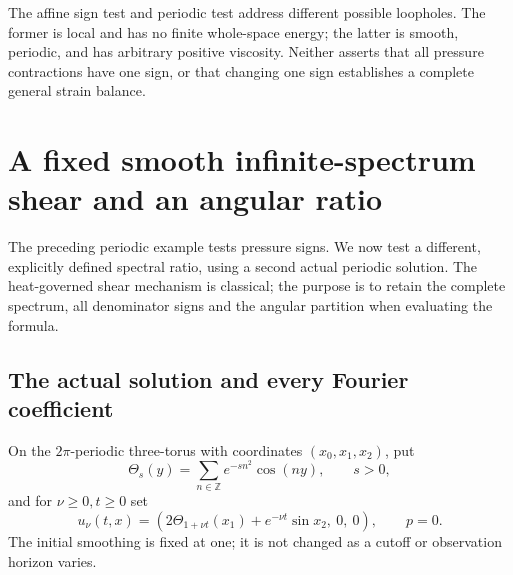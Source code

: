 \documentclass[11pt]{article}
\begin{document}
The affine sign test and periodic test address different possible
loopholes. The former is local and has no finite whole-space energy;
the latter is smooth, periodic, and has arbitrary positive viscosity.
Neither asserts that all pressure contractions have one sign, or that
changing one sign establishes a complete general strain balance.

\section{A fixed smooth infinite-spectrum shear and an angular ratio}
The preceding periodic example tests pressure signs. We now test a different,
explicitly defined spectral ratio, using a second actual periodic solution.
The heat-governed shear mechanism is classical; the purpose is to retain
the complete spectrum, all denominator signs and the angular partition
when evaluating the formula.

\subsection{The actual solution and every Fourier coefficient}
On the $2\pi$-periodic three-torus with coordinates $(x_0,x_1,x_2)$, put
\[
 \Theta_s(y)=\sum_{n\in\mathbb Z}e^{-sn^2}\cos(ny),\qquad s>0,
\]
and for $\nu\geq0,t\geq0$ set
\begin{equation}\label{eq:infshear}
 u_\nu(t,x)=\left(2\Theta_{1+\nu t}(x_1)
                         +e^{-\nu t}\sin x_2,\ 0,\ 0\right),\qquad p=0.
\end{equation}
The initial smoothing is fixed at one; it is not changed as a cutoff or
observation horizon varies.
\end{document}
